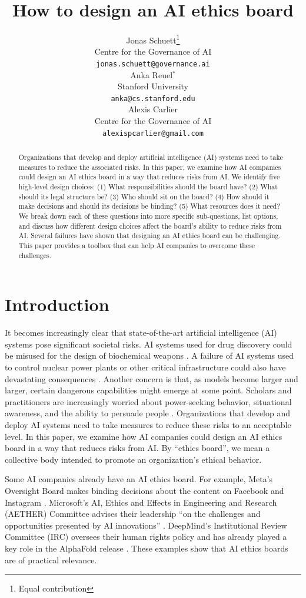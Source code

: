 \documentclass{article}
\title{How to design an AI ethics board}
\author{
  Jonas Schuett\thanks{Equal contribution} \\
  Centre for the Governance of AI \\
  \texttt{jonas.schuett@governance.ai} \\
  \And
  Anka Reuel$^*$ \\
  Stanford University \\
  \texttt{anka@cs.stanford.edu} \\
  \AND
  Alexis Carlier \\
  Centre for the Governance of AI \\
  \texttt{alexispcarlier@gmail.com} \\
}
\begin{document}
\maketitle

\begin{abstract}
  Organizations that develop and deploy artificial intelligence (AI) systems need to take measures to reduce the associated risks. In this paper, we examine how AI companies could design an AI ethics board in a way that reduces risks from AI. We identify five high-level design choices: (1) What responsibilities should the board have? (2) What should its legal structure be? (3) Who should sit on the board? (4) How should it make decisions and should its decisions be binding? (5) What resources does it need? We break down each of these questions into more specific sub-questions, list options, and discuss how different design choices affect the board’s ability to reduce risks from AI. Several failures have shown that designing an AI ethics board can be challenging. This paper provides a toolbox that can help AI companies to overcome these challenges.
\end{abstract}

\section{Introduction} \label{Ch:1:introduction}

It becomes increasingly clear that state-of-the-art artificial intelligence (AI) systems pose significant societal risks. AI systems used for drug discovery could be misused for the design of biochemical weapons \cite{urbina2022dual}. A failure of AI systems used to control nuclear power plants or other critical infrastructure could also have devastating consequences \cite{degrave2022magnetic}. Another concern is that, as models become larger and larger, certain dangerous capabilities might emerge at some point. Scholars and practitioners are increasingly worried about power-seeking behavior, situational awareness, and the ability to persuade people \cite{carlsmith2022powerseeking, ngo2023alignment, openai2023gpt4technical}. Organizations that develop and deploy AI systems need to take measures to reduce these risks to an acceptable level. In this paper, we examine how AI companies could design an AI ethics board in a way that reduces risks from AI. By “ethics board”, we mean a collective body intended to promote an organization’s ethical behavior.

Some AI companies already have an AI ethics board. For example, Meta’s Oversight Board makes binding decisions about the content on Facebook and Instagram \cite{oversightboard2023website, klonick2020facebook, wong2022meta}. Microsoft’s AI, Ethics and Effects in Engineering and Research (AETHER) Committee advises their leadership “on the challenges and opportunities presented by AI innovations” \cite{microsoft2023ourapproach}. DeepMind’s Institutional Review Committee (IRC) oversees their human rights policy \cite{deepmind2023humanrightspolicy} and has already played a key role in the AlphaFold release \cite{kavukcuoglu2022alphafold}. These examples show that AI ethics boards are of practical relevance.
\end{document}
